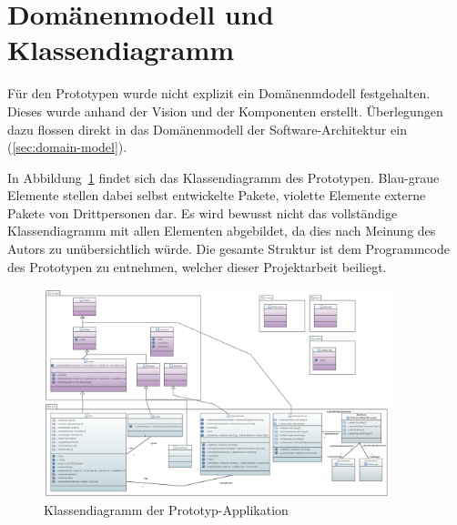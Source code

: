
\section{Domänenmodell und Klassendiagramm}
\label{sec:prototype:domain-model-class-diagram}

Für den Prototypen wurde nicht explizit ein Domänenmdodell festgehalten. Dieses
wurde anhand der Vision und der Komponenten erstellt. Überlegungen dazu flossen
direkt in das Domänenmodell der Software-Architektur ein
(\ref{sec:domain-model}).

In Abbildung~\ref{fig:class-diagram:prototype} findet sich das Klassendiagramm
des Prototypen. Blau-graue Elemente stellen dabei selbst entwickelte Pakete,
violette Elemente externe Pakete von Drittpersonen dar. Es wird bewusst
nicht das vollständige Klassendiagramm mit allen Elementen abgebildet, da dies
nach Meinung des Autors zu unübersichtlich würde. Die gesamte Struktur ist dem
Programmcode des Prototypen zu entnehmen, welcher dieser Projektarbeit
beiliegt.

\begin{figure}[H]
    \centering
    \includegraphics[width=0.9\textwidth]{img/prototype_class_diagram.png}
    \caption{Klassendiagramm der
        Prototyp-Applikation\protect\footnotemark}\label{fig:class-diagram:prototype}
\end{figure}
